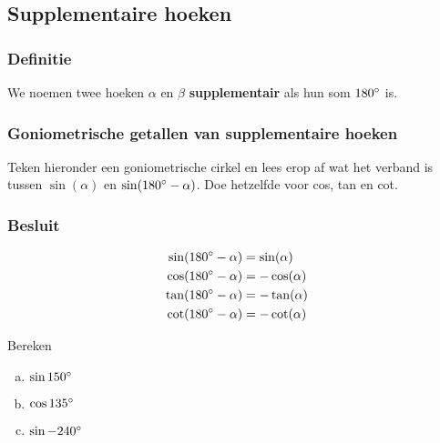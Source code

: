 \documentclass[a4paper,12pt]{article}
\begin{document}
\begin{theorie}

\pagebreak
\subsection{Supplementaire hoeken}

\subsubsection*{Definitie}
We noemen twee hoeken $\alpha$ en $\beta$ \textbf{supplementair} als hun som $180^\circ$ is.

\subsubsection*{Goniometrische getallen van supplementaire hoeken}
Teken hieronder een goniometrische cirkel en lees erop af wat het verband is tussen $\sin(\alpha)$ en $\sin(180^\circ-\alpha)$. Doe hetzelfde voor cos, tan en cot.
\vspace*{7cm}
\subsubsection*{Besluit}
\begin{align*}
  \sin(180^\circ-\alpha)&=\sin(\alpha)\\
  \cos(180^\circ-\alpha)&=-\cos(\alpha)\\
  \tan(180^\circ-\alpha)&=-\tan(\alpha)\\
  \cot(180^\circ-\alpha)&=-\cot(\alpha)
\end{align*}

\end{theorie}

\begin{oefening}
Bereken
\begin{enumerate}[(a)]
  \item $\sin150^\circ$
  \item $\cos135^\circ$
  \item $\sin-240^\circ$
\end{enumerate}
\end{oefening}
\end{document}
